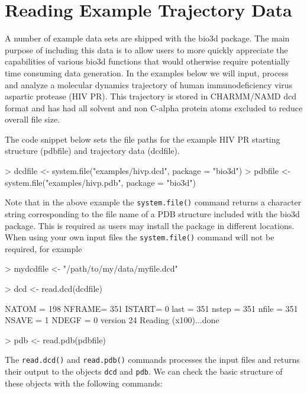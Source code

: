 \documentclass[letter]{article}
\begin{document}
\section{Reading Example Trajectory Data}
A number of example data sets are shipped with the bio3d package. The main purpose of including this data is to allow users to more quickly appreciate the capabilities of various bio3d functions that would otherwise require potentially time consuming data generation. In the examples below we will input, process and analyze a molecular dynamics trajectory of human immunodeficiency virus aspartic protease (HIV PR). This trajectory is stored in CHARMM/NAMD dcd format and has had all solvent and non C-alpha protein atoms excluded to reduce overall file size.


The code snippet below sets the file paths for the example HIV PR starting structure (pdbfile) and trajectory data (dcdfile).
\begin{Schunk}
\begin{Sinput}
> dcdfile <- system.file("examples/hivp.dcd", package = "bio3d")
> pdbfile <- system.file("examples/hivp.pdb", package = "bio3d")
\end{Sinput}
\end{Schunk}
Note that in the above example the \texttt{system.file()} command returns a character string corresponding to the file name of a PDB structure included with the bio3d package. This is required as users may install the package in different locations. When using your own input files the \texttt{system.file()} command will not be required, for example

\begin{Schunk}
\begin{Sinput}
> mydcdfile <- "/path/to/my/data/myfile.dcd"
\end{Sinput}
\end{Schunk}

\begin{Schunk}
\begin{Sinput}
> dcd <- read.dcd(dcdfile)
\end{Sinput}
\begin{Soutput}
 NATOM = 198 
 NFRAME= 351 
 ISTART= 0 
 last  = 351 
 nstep = 351 
 nfile = 351 
 NSAVE = 1 
 NDEGF = 0 
 version 24 
Reading (x100)...done
\end{Soutput}
\begin{Sinput}
> pdb <- read.pdb(pdbfile)
\end{Sinput}
\end{Schunk}
The \texttt{read.dcd()} and \texttt{read.pdb()} commands processes the input files and returns their output to the objects \texttt{dcd} and \texttt{pdb}. We can check the basic structure of these objects with the following commands:
\end{document}
